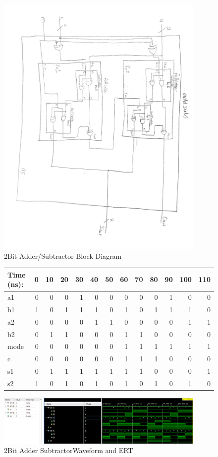 \documentclass[11pt]{article}
\begin{document}
\begin{figure}
	\includegraphics[width=0.9\textwidth]{2B_block}
	\caption{2Bit Adder/Subtractor Block Diagram}
	\label{fig:2B_block}
\end{figure}
\medskip
\begin{figure}[ht]\centering
\begin{tabular}{l|rrrrrrrrrrrr}
	Time (ns): & 0 & 10 & 20 & 30 & 40 & 50 & 60 & 70 & 80 & 90 & 100 & 110\\
	\midrule
	a1  & 0 & 0 & 0 & 1 & 0 & 0 & 0 & 0 & 0 & 1 & 0 & 0\\
	b1  & 1 & 0 & 1 & 1 & 1 & 0 & 1 & 0 & 1 & 1 & 1 & 0\\
	a2  & 0 & 0 & 0 & 0 & 1 & 1 & 0 & 0 & 0 & 0 & 1 & 1\\
	b2  & 0 & 1 & 1 & 0 & 0 & 0 & 1 & 1 & 0 & 0 & 0 & 0\\
	mode & 0 & 0 & 0 & 0 & 0 & 0 & 1 & 1 & 1 & 1 & 1 & 1 \\
	\midrule
	c & 0 & 0 & 0 & 0 & 0 & 0 & 1 & 1 & 1 & 0 & 0 & 0\\
	s1 & 0 & 1 & 1 & 1 & 1 & 1 & 1 & 1 & 0 & 0 & 0 & 1\\
	s2 & 1 & 0 & 1 & 0 & 1 & 0 & 1 & 0 & 1 & 0 & 1 & 0\\
	\bottomrule
\end{tabular}\medskip



\includegraphics[width=0.9\textwidth]{2B_snip}
\caption{2Bit Adder SubtractorWaveform and ERT}
\label{fig:2B_ert}
\end{figure}

\medskip
\medskip
\end{document}
